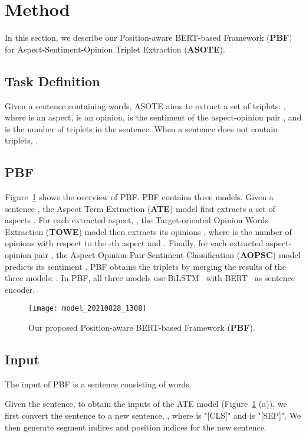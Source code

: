 \documentclass[11pt]{article}
\begin{document}
\section{Method}
In this section, we describe our Position-aware BERT-based Framework (\textbf{PBF}) for Aspect-Sentiment-Opinion Triplet Extraction (\textbf{ASOTE}). 

\subsection{Task Definition}
Given a sentence  containing  words, ASOTE aims to extract a set of triplets: , where  is an aspect,  is an opinion,  is the sentiment of the aspect-opinion pair , and  is the number of triplets in the sentence. When a sentence does not contain triplets,  .

\subsection{PBF}
Figure~\ref{fig:PBF} shows the overview of PBF. PBF contains three models. Given a sentence , the Aspect Term Extraction (\textbf{ATE}) model first extracts a set of aspects . For each extracted aspect, , the Target-oriented Opinion Words Extraction (\textbf{TOWE}) model then extracts its opinions , where  is the number of opinions with respect to the -th aspect and . Finally, for each extracted aspect-opinion pair , the Aspect-Opinion Pair Sentiment Classification (\textbf{AOPSC}) model predicts its sentiment  . PBF obtains the triplets by merging the results of the three models: . In PBF, all three models use BiLSTM~\citep{graves2013speech} with BERT~\citep{devlin2019bert} as sentence encoder.

\begin{figure}
	\centering
	\texttt{[image: model\_20210828\_1308]}
	\caption{Our proposed Position-aware BERT-based Framework (\textbf{PBF}).}
	\label{fig:PBF}
\end{figure}

\subsection{Input}
The input of PBF is a sentence  consisting of  words.

Given the sentence, to obtain the inputs of the ATE model (Figure~\ref{fig:PBF} (a)), we first convert the sentence  to a new sentence, , where  is "[CLS]" and  is "[SEP]". We then generate segment indices  and position indices  for the new sentence. 
\end{document}
